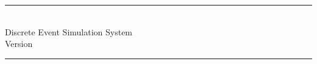 

\begin{center}\end{center}
\vspace{16em}
\hrule
\vspace{2em}
\begin{center}
\tbf{{\huge {\opp}}}\\
\vspace{1.5em}
{\LARGE Discrete Event Simulation System}\\
\vspace{1em}
{\large Version {\oppversion}}\\
\vspace{1em}
\end{center}
\vspace{2em}
\hrule


\vspace{8em}




